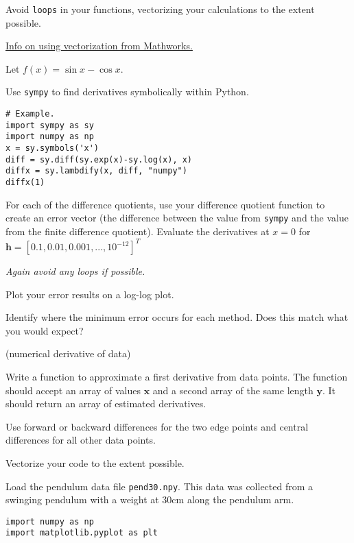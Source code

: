 \documentclass[12pt,letterpaper,noanswers]{exam}
\newcommand{\vc}[1]{\boldsymbol{#1}}
\begin{document}
\begin{questions}
\begin{parts}
Avoid \texttt{loops} in your functions, vectorizing your calculations to the extent possible.

\href{https://www.mathworks.com/help/matlab/matlab_prog/vectorization.html}{Info on using vectorization from Mathworks.}


\item Let $f(x) = \sin x - \cos x$.  


Use \texttt{sympy} to find derivatives symbolically within Python.

\begin{verbatim}
# Example.
import sympy as sy
import numpy as np
x = sy.symbols('x')
diff = sy.diff(sy.exp(x)-sy.log(x), x)
diffx = sy.lambdify(x, diff, "numpy")
diffx(1)
\end{verbatim}


For each of the difference quotients, use your difference quotient function to create an error vector (the difference between the value from \texttt{sympy} and the value from the finite difference quotient).  Evaluate the derivatives at $x = 0$ for $\vc{h} = [0.1,0.01,0.001,...,10^{-12}]^T$

\emph{Again avoid any loops if possible.}

\item Plot your error results on a log-log plot.

Identify where the minimum error occurs for each method.  Does this match what you would expect? 

\end{parts}

\question (numerical derivative of data)
\begin{parts}
\item Write a function to approximate a first derivative from data points.  The function should accept an array of values $\vc{x}$ and a second array of the same length $\vc{y}$.  It should return an array of estimated derivatives.  

Use forward or backward differences for the two edge points and central differences for all other data points.

Vectorize your code to the extent possible.


\item Load the pendulum data file \texttt{pend30.npy}.  This data was collected from a swinging pendulum with a weight at 30cm along the pendulum arm.
\begin{verbatim}
import numpy as np
import matplotlib.pyplot as plt


\end{verbatim}
\end{parts}
\end{questions}
\end{document}
